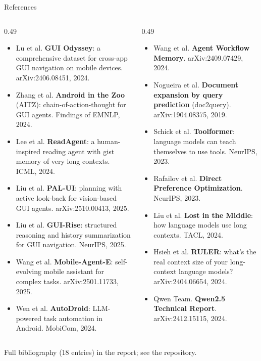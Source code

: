 \documentclass[aspectratio=169,10pt]{beamer}
\newcommand{\gr}[1]{{\color{ncgray}#1}}
\begin{document}
\begin{frame}{References}
\vspace{0.25cm}
{\scriptsize
\begin{columns}[T]
\begin{column}{0.49\textwidth}
\begin{itemize}\setlength\itemsep{0.30em}\setlength\leftmargini{1.1em}
\item Lu et al. \textbf{GUI Odyssey}: a comprehensive dataset for cross-app GUI navigation on mobile devices. arXiv:2406.08451, 2024.
\item Zhang et al. \textbf{Android in the Zoo} (AITZ): chain-of-action-thought for GUI agents. Findings of EMNLP, 2024.
\item Lee et al. \textbf{ReadAgent}: a human-inspired reading agent with gist memory of very long contexts. ICML, 2024.
\item Liu et al. \textbf{PAL-UI}: planning with active look-back for vision-based GUI agents. arXiv:2510.00413, 2025.
\item Liu et al. \textbf{GUI-Rise}: structured reasoning and history summarization for GUI navigation. NeurIPS, 2025.
\item Wang et al. \textbf{Mobile-Agent-E}: self-evolving mobile assistant for complex tasks. arXiv:2501.11733, 2025.
\item Wen et al. \textbf{AutoDroid}: LLM-powered task automation in Android. MobiCom, 2024.
\end{itemize}
\end{column}
\begin{column}{0.49\textwidth}
\begin{itemize}\setlength\itemsep{0.30em}\setlength\leftmargini{1.1em}
\item Wang et al. \textbf{Agent Workflow Memory}. arXiv:2409.07429, 2024.
\item Nogueira et al. \textbf{Document expansion by query prediction} (doc2query). arXiv:1904.08375, 2019.
\item Schick et al. \textbf{Toolformer}: language models can teach themselves to use tools. NeurIPS, 2023.
\item Rafailov et al. \textbf{Direct Preference Optimization}. NeurIPS, 2023.
\item Liu et al. \textbf{Lost in the Middle}: how language models use long contexts. TACL, 2024.
\item Hsieh et al. \textbf{RULER}: what's the real context size of your long-context language models? arXiv:2404.06654, 2024.
\item Qwen Team. \textbf{Qwen2.5 Technical Report}. arXiv:2412.15115, 2024.
\end{itemize}
\end{column}
\end{columns}}
\vspace{0.3cm}
{\scriptsize\gr{Full bibliography (18 entries) in the report; see the repository.}}
\end{frame}
\end{document}
